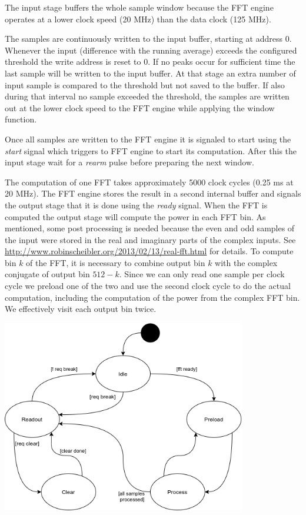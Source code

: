 \documentclass[a4paper,indent]{paper}
\begin{document}
The input stage buffers the whole sample window because the FFT engine operates at a lower clock speed (20 MHz) than the data clock (125 MHz).

The samples are continuously written to the input buffer, starting at address 0. Whenever the input (difference with the running average) exceeds the configured threshold the write address is reset to 0. If no peaks occur for sufficient time the last sample will be written to the input buffer. At that stage an extra number of input sample is compared to the threshold but not saved to the buffer. If also during that interval no sample exceeded the threshold, the samples are written out at the lower clock speed to the FFT engine while applying the window function. 

Once all samples are written to the FFT engine it is signaled to start using the \emph{start} signal which triggers to FFT engine to start its computation. After this the input stage wait for a \emph{rearm} pulse before preparing the next window.

The computation of one FFT takes approximately 5000 clock cycles (0.25 ms at 20 MHz). The FFT engine stores the result in a second internal buffer and signals the output stage that it is done using the \emph{ready} signal.
When the FFT is computed the output stage will compute the power in each FFT bin. As mentioned, some post processing is needed because the even and odd samples of the input were stored in the real and imaginary parts of the complex inputs. See \url{http://www.robinscheibler.org/2013/02/13/real-fft.html} for details. To compute bin $k$ of the FFT, it is necessary to combine output bin $k$ with the complex conjugate of output bin $512-k$. Since we can only read one sample per clock cycle we preload one of the two and use the second clock cycle to do the actual computation, including the computation of the power from the complex FFT bin. We effectively visit each output bin twice. 



\begin{center}
  \includegraphics[width=0.8\textwidth]{img/outputstage.png}
  \label{fig:outputstage_states}
\end{center}
\end{document}
